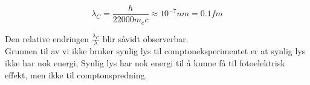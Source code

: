 \documentclass[norsk,a4paper,12pt]{article}
\begin{document}
\begin{equation}
\lambda_C = \frac{h}{22000m_ec} \approx 10^{-7} nm = 0.1fm
\end{equation}

Den relative endringen $\frac{\lambda_C}{\lambda}$ blir såvidt observerbar. 
\\

Grunnen til av vi ikke bruker synlig lys til comptoneksperimentet er at synlig lys ikke har nok energi, Synlig lys har nok energi til å kunne få til fotoelektrisk effekt, men ikke til comptonspredning.
\end{document}
